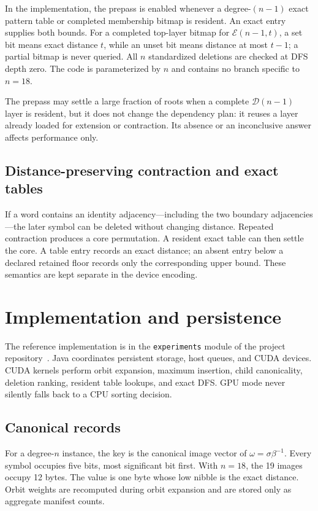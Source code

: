 \documentclass[11pt]{article}
\theoremstyle{definition}
\theoremstyle{remark}
\newcommand{\E}{\mathcal E}
\newcommand{\D}{\mathcal D}
\newcommand{\code}[1]{\texttt{#1}}
\begin{document}
In the implementation, the prepass is enabled whenever a degree-$(n-1)$
exact pattern table or completed membership bitmap is resident.  An exact
entry supplies both bounds.  For a completed top-layer bitmap for
$\E(n-1,t)$, a set bit means exact distance $t$, while an unset bit means
distance at most $t-1$; a partial bitmap is never queried.  All $n$
standardized deletions are checked at DFS depth zero.  The code is
parameterized by $n$ and contains no branch specific to $n=18$.

The prepass may settle a large fraction of roots when a complete
$\D(n-1)$ layer is resident, but it does not change the dependency plan: it
reuses a layer already loaded for extension or contraction.  Its absence or
an inconclusive answer affects performance only.

\subsection{Distance-preserving contraction and exact tables}

If a word contains an identity adjacency---including the two boundary
adjacencies---the later symbol can be deleted without changing distance.
Repeated contraction produces a core permutation.  A resident exact table
can then settle the core.  A table entry records an exact distance; an absent
entry below a declared retained floor records only the corresponding upper
bound.  These semantics are kept separate in the device encoding.

\section{Implementation and persistence}
\label{sec:implementation}

The reference implementation is in the \code{experiments} module of the
project repository~\cite{SourceCode}.  Java coordinates persistent storage,
host queues, and CUDA devices.  CUDA kernels perform orbit expansion,
maximum insertion, child canonicality, deletion ranking, resident table
lookups, and exact DFS.  GPU mode never silently falls back to a CPU sorting
decision.

\subsection{Canonical records}

For a degree-$n$ instance, the key is the canonical image vector of
$\omega=\sigma\beta^{-1}$.  Every symbol occupies five bits, most significant
bit first.  With $n=18$, the 19 images occupy 12 bytes.  The value is one byte
whose low nibble is the exact distance.  Orbit weights are recomputed during
orbit expansion and are stored only as aggregate manifest counts.
\end{document}
